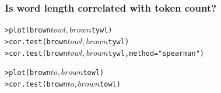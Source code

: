 \documentclass[t]{beamer} %
\begin{document}
\begin{frame}[fragile]
  \frametitle{Is word length correlated with token count?}

\begin{alltt}

> plot(brown$towl, brown$tywl)
> cor.test(brown$towl, brown$tywl)
> cor.test(brown$towl, brown$tywl, method="spearman")


> plot(brown$to, brown$towl)
> cor.test(brown$to, brown$towl)
\end{alltt}

\end{frame}


\end{document}
